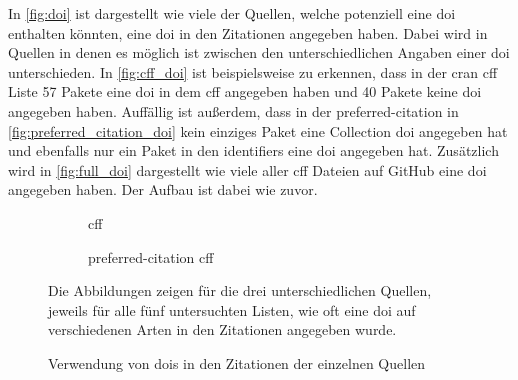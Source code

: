 In \autoref{fig:doi} ist dargestellt wie viele der Quellen, welche potenziell eine \gls{doi} enthalten könnten, eine \gls{doi} in den Zitationen angegeben haben.
Dabei wird in Quellen in denen es möglich ist zwischen den unterschiedlichen Angaben einer \gls{doi} unterschieden.
In \autoref{fig:cff_doi} ist beispielsweise zu erkennen, dass in der \gls{cran} \gls{cff} Liste 57 Pakete eine \gls{doi} in dem \gls{cff} angegeben haben und 40 Pakete keine \gls{doi} angegeben haben.
Auffällig ist außerdem, dass in der \glqq preferred-citation\grqq{} in \autoref{fig:preferred_citation_doi} kein einziges Paket eine Collection \gls{doi} angegeben hat und ebenfalls nur ein Paket in den \glqq identifiers\grqq{} eine \gls{doi} angegeben hat.
Zusätzlich wird in \autoref{fig:full_doi} dargestellt wie viele aller \gls{cff} Dateien auf GitHub eine \gls{doi} angegeben haben.
Der Aufbau ist dabei wie zuvor.

\begin{figure}
    \begin{subfigure}{.5\textwidth}
        \centering
        
        \caption{\gls{cff}}
        \label{fig:cff_doi}
    \end{subfigure}%
    \begin{subfigure}{.5\textwidth}
        \centering
        
        \caption{\glqq preferred-citation\grqq{} \gls{cff}}
        \label{fig:preferred_citation_doi}
    \end{subfigure}
    \centering
    \begin{subfigure}{.5\textwidth}
        \centering
        
        \caption{}
        \label{fig:bib_doi}
    \end{subfigure}
    \caption{Verwendung von \gls{doi}s in den Zitationen der einzelnen Quellen}
    \label{fig:doi}
    \small
    \raggedright
    Die Abbildungen zeigen für die drei unterschiedlichen Quellen, jeweils für alle fünf untersuchten Listen, wie oft eine \gls{doi} auf verschiedenen Arten in den Zitationen angegeben wurde.
\end{figure}

